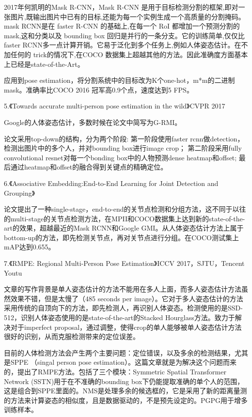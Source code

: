 \documentclass[11pt]{article}
\begin{document}
2017年何凯明的Mask R-CNN，Mask R-CNN 是用于目标检测分割的框架,即对一张图片,既输出图片中已有的目标,还能为每一个实例生成一个高质量的分割掩码。mask RCNN是在 faster R-CNN 的基础上,在每一个 RoI 都增加一个预测分割的mask,这和分类以及 bounding box 回归是并行的一条分支。它的训练简单,仅仅比 faster RCNN多一点计算开销。它易于泛化到多个任务上,例如人体姿态估计。在不加任何的 trick的情况下,在COCO 数据集上超越其他的方法。因此准确度方面基本上已经是state-of-the-Art。

应用到pose estimation，将分割系统中的目标改为K个one-hot，m*m的二进制mask。准确率比COCO 2016 冠军高0.9个点，速度达到5 FPS。

5.《Towards accurate multi-person pose estimation in the wild》CVPR 2017

Google的人体姿态估计，多数时候在论文中简写为G-RMI。

论文采用top-down的结构，分为两个阶段: 第一阶段使用faster rcnn做detection，检测出图片中的多个人，并对bounding box进行image crop； 第二阶段采用fully convolutional resnet对每一个bonding box中的人物预测dense heatmap和offset; 最后通过heatmap和offset的融合得到关键点的精确定位。

6.《Associative Embedding:End-to-End Learning for Joint Detection and Grouping》

论文提出了一种single-stage，end-to-end的关节点检测和分组方法，这不同于以往的multi-stage的关节点检测方法，在MPII和COCO数据集上达到新的state-of-the-art的效果，超越最近的Mask RCNN和Google GMI。从人体姿态估计方法上属于bottom-up的方法，即先检测关节点，再对关节点进行分组。在COCO测试集上mAP达到0.655。

7.《RMPE: Regional Multi-Person Pose Estimation》ICCV 2017，SJTU，Tencent Youtu

文章的写作背景是单人姿态估计的方法不能用在多人上面，而多人姿态估计方法虽然效果不错，但是太慢了（485 seconds per image）。它对于多人姿态估计的方法采用传统的自顶向下的方法，即先检测人，再识别人体姿态。检测使用的是SSD-512，识别人体姿态使用的是state-of-the-art的Stacked Hourglass方法。致力于解决对于imperfect proposal，通过调整，使得crop的单人能够被单人姿态估计方法很好的识别，从而克服检测带来的定位误差。

目前的人体检测方法会产生两个主要问题：定位错误，以及多余的检测结果，尤其是SPPE （singal person pose estimation）。这篇文章就是为解决这个问题而来的，提出了RMPE方法。包括了三个模块：Symmetric Spatial Transformer Network (SSTN)用于在不准确的bounding box下仍能提取准确的单个人的范围，这是组合到SPPE里面的。NMS是处理多余的候选框的，它是采用了新的距离量测的方法来计算姿态的相似度，且是数据驱动的，不是预先设定的。PGPG用于增多训练样本。
\end{document}
